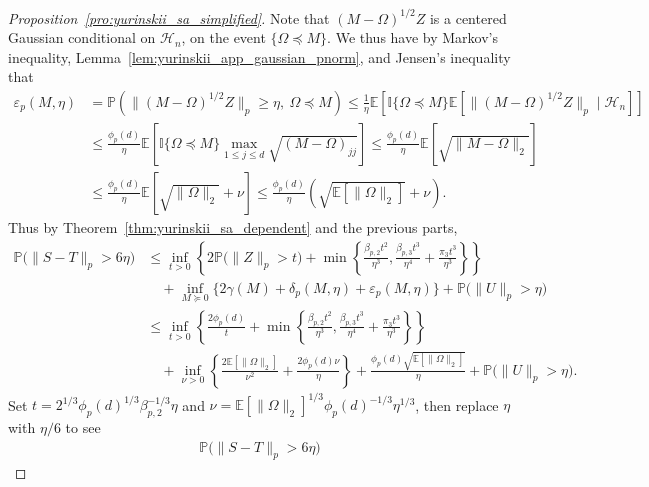 \documentclass[11pt,lof]{puthesis}
\renewcommand{\P}{\ensuremath{\mathbb{P}}}
\newcommand{\E}{\ensuremath{\mathbb{E}}}
\newcommand{\I}{\ensuremath{\mathbb{I}}}
\newcommand{\cH}{\ensuremath{\mathcal{H}}}
\theoremstyle{break}
\theoremstyle{proof}
\newtheorem{proof}{Proof}
\begin{document}
\begin{proof}[Proposition~\ref{pro:yurinskii_sa_simplified}]
  Note that $(M -\Omega)^{1/2}Z$ is a centered Gaussian
  conditional on $\cH_n$,
  on the event $\{\Omega \preceq M\}$.
  We thus have by Markov's inequality,
  Lemma~\ref{lem:yurinskii_app_gaussian_pnorm},
  and Jensen's inequality that
  \begin{align*}
    \varepsilon_p(M, \eta)
    &= \P\left(\big\| (M - \Omega)^{1/2} Z \big\|_p\geq \eta, \
    \Omega \preceq M\right)
    \leq
    \frac{1}{\eta}
    \E\left[
      \I\{\Omega \preceq M\}
      \E\left[
        \big\| (M - \Omega)^{1/2} Z \big\|_p
        \mid \cH_n
      \right]
    \right] \\
    &\leq
    \frac{\phi_p(d)}{\eta}
    \E\left[
      \I\{\Omega \preceq M\}
      \max_{1 \leq j \leq d}
      \sqrt{(M - \Omega)_{j j}}
    \right]
    \leq
    \frac{\phi_p(d)}{\eta}
    \E\left[
      \sqrt{\|M - \Omega\|_2}
    \right] \\
    &\leq
    \frac{\phi_p(d)}{\eta}
    \E\left[
      \sqrt{\|\Omega\|_2} + \nu
    \right]
    \leq
    \frac{\phi_p(d)}{\eta}
    \left(\sqrt{\E[\|\Omega\|_2]} + \nu \right).
  \end{align*}
  Thus by Theorem~\ref{thm:yurinskii_sa_dependent} and the previous parts,
  \begin{align*}
    \P\big(\|S-T\|_p > 6\eta\big)
    &\leq
    \inf_{t>0}
    \left\{
      2 \P\big(\|Z\|_p>t\big)
      + \min\left\{
        \frac{\beta_{p,2} t^2}{\eta^3},
        \frac{\beta_{p,3} t^3}{\eta^4}
        + \frac{\pi_3 t^3}{\eta^3}
      \right\}
    \right\} \\
    &\quad+
    \inf_{M \succeq 0}
    \big\{ 2\gamma(M) + \delta_p(M,\eta)
    + \varepsilon_p(M, \eta)\big\}
    +\P\big(\|U\|_p>\eta\big) \\
    &\leq
    \inf_{t>0}
    \left\{
      \frac{2 \phi_p(d)}{t}
      + \min\left\{
        \frac{\beta_{p,2} t^2}{\eta^3},
        \frac{\beta_{p,3} t^3}{\eta^4}
        + \frac{\pi_3 t^3}{\eta^3}
      \right\}
    \right\} \\
    &\quad+
    \inf_{\nu > 0}
    \left\{ \frac{2\E \left[ \|\Omega\|_2 \right]}{\nu^2}
      + \frac{2 \phi_p(d) \nu}{\eta}
    \right\}
    + \frac{\phi_p(d) \sqrt{\E \left[ \|\Omega\|_2 \right]}}{\eta}
    +\P\big(\|U\|_p>\eta\big).
  \end{align*}
  Set $t = 2^{1/3} \phi_p(d)^{1/3} \beta_{p,2}^{-1/3} \eta$
  and $\nu = \E[\|\Omega\|_2]^{1/3} \phi_p(d)^{-1/3} \eta^{1/3}$,
  then replace $\eta$ with $\eta / 6$ to see
  \begin{align*}
    \P\big(\|S-T\|_p > 6\eta\big)

\end{align*}
\end{proof}
\end{document}
